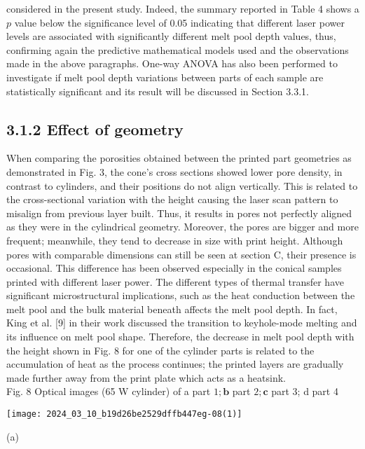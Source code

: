 \documentclass[10pt]{article}
\begin{document}
considered in the present study. Indeed, the summary reported in Table 4 shows a $p$ value below the significance level of 0.05 indicating that different laser power levels are associated with significantly different melt pool depth values, thus, confirming again the predictive mathematical models used and the observations made in the above paragraphs. One-way ANOVA has also been performed to investigate if melt pool depth variations between parts of each sample are statistically significant and its result will be discussed in Section 3.3.1.

\subsection*{3.1.2 Effect of geometry}
When comparing the porosities obtained between the printed part geometries as demonstrated in Fig. 3, the cone's cross sections showed lower pore density, in contrast to cylinders, and their positions do not align vertically. This is related to the cross-sectional variation with the height causing the laser scan pattern to misalign from previous layer built. Thus, it results in pores not perfectly aligned as they were in the cylindrical geometry. Moreover, the pores are bigger and more frequent; meanwhile, they tend to decrease in size with print height. Although pores with comparable dimensions can still be seen at section $\mathrm{C}$, their presence is occasional. This difference has been observed especially in the conical samples printed with different laser power. The different types of thermal transfer have significant microstructural implications, such as the heat conduction between the melt pool and the bulk material beneath affects the melt pool depth. In fact, King et al. [9] in their work discussed the transition to keyhole-mode melting and its influence on melt pool shape. Therefore, the decrease in melt pool depth with the height shown in Fig. 8 for one of the cylinder parts is related to the accumulation of heat as the process continues; the printed layers are gradually made further away from the print plate which acts as a heatsink.\\
Fig. 8 Optical images (65 W cylinder) of a part $1 ; \mathbf{b}$ part $2 ; \mathbf{c}$ part 3; d part 4

\begin{center}
\texttt{[image: 2024\_03\_10\_b19d26be2529dffb447eg-08(1)]}
\end{center}

(a)
\end{document}
